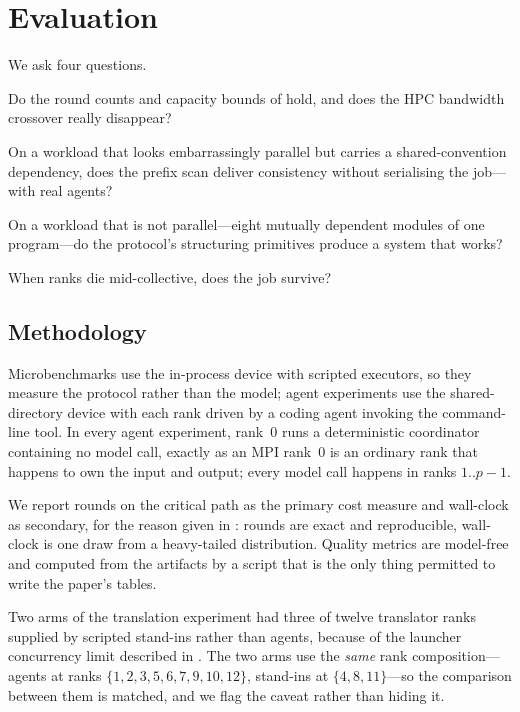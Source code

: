 \section{Evaluation}
\label{sec:eval}

We ask four questions.

\begin{description}[leftmargin=1.4em,style=nextline]
\item[Q1 (\Cref{sec:eval-micro})] Do the round counts and capacity bounds of
 hold, and does the HPC bandwidth crossover really disappear?
\item[Q2 (\Cref{sec:eval-translation})] On a workload that looks
embarrassingly parallel but carries a shared-convention dependency, does the
prefix scan deliver consistency without serialising the job---with real
agents?
\item[Q3 (\Cref{sec:eval-software})] On a workload that is not
parallel---eight mutually dependent modules of one program---do the
protocol's structuring primitives produce a system that works?
\item[Q4 (\Cref{sec:eval-faults})] When ranks die mid-collective, does the
job survive?
\end{description}

\subsection{Methodology}

Microbenchmarks use the in-process device with scripted executors, so they
measure the protocol rather than the model; agent experiments use the
shared-directory device with each rank driven by a coding agent invoking the
 command-line tool. In every agent experiment, rank~0 runs a
deterministic coordinator containing no model call, exactly as an MPI rank~0
is an ordinary rank that happens to own the input and output; every model
call happens in ranks $1..p-1$.

We report rounds on the critical path as the primary cost measure and
wall-clock as secondary, for the reason given in : rounds are
exact and reproducible, wall-clock is one draw from a heavy-tailed
distribution. Quality metrics are model-free and computed from the artifacts
by a script that is the only thing permitted to write the paper's tables.

Two arms of the translation experiment had three of twelve translator ranks
supplied by scripted stand-ins rather than agents, because of the launcher
concurrency limit described in . The two arms
use the \emph{same} rank composition---agents at ranks
$\{1,2,3,5,6,7,9,10,12\}$, stand-ins at $\{4,8,11\}$---so the comparison
between them is matched, and we flag the caveat rather than hiding it.

